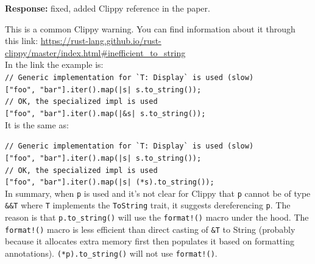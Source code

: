 \documentclass{article}
\begin{document}
\vspace*{1em} \noindent \textbf{Response:} fixed, added Clippy reference in the paper. 

This is a common Clippy warning. You can find information about it through this link: \url{https://rust-lang.github.io/rust-clippy/master/index.html#inefficient_to_string} \\

In the link the example is: \\

\noindent\verb+// Generic implementation for `T: Display` is used (slow)+ \\
\verb+["foo", "bar"].iter().map(|s| s.to_string());+\\

\noindent\verb+// OK, the specialized impl is used+\\
\verb+["foo", "bar"].iter().map(|&s| s.to_string());+\\

It is the same as:

\noindent\verb+// Generic implementation for `T: Display` is used (slow)+\\
\verb+["foo", "bar"].iter().map(|s| s.to_string());+\\

\noindent\verb+// OK, the specialized impl is used+\\
\verb+["foo", "bar"].iter().map(|s| (*s).to_string());+\\

In summary, when \verb+p+ is used and it's not clear for Clippy that \verb+p+ cannot be of type \verb+&&T+ where \verb+T+ implements the \verb+ToString+ trait, it suggests dereferencing \verb+p+. The reason is that \verb+p.to_string()+ will use the \verb+format!()+ macro under the hood. The \verb+format!()+ macro is less efficient than direct casting of \verb+&T+ to String (probably because it allocates extra memory first then populates it based on formatting annotations). \verb+(*p).to_string()+ will not use \verb+format!()+.



\small


\end{document}
